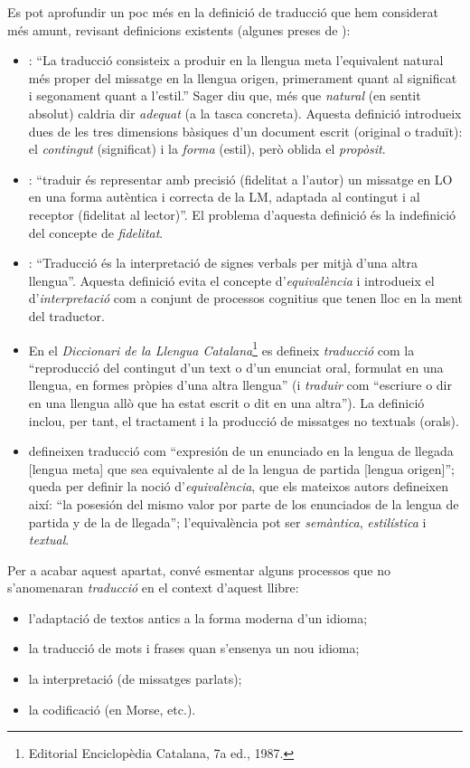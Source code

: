 Es pot aprofundir un poc més en la definició de traducció que hem
considerat més amunt, revisant definicions existents (algunes preses
de \citealt{sager93b}):
\begin{itemize}
\item \citet[p.~19]{nida59b}: ``La traducció consisteix a produir en
  la llengua meta l'equivalent natural més proper del missatge en la
  llengua origen, primerament quant al significat i segonament quant a
  l'estil.'' Sager diu que, més que \emph{natural} (en sentit absolut)
  caldria dir \emph{adequat} (a la tasca concreta). Aquesta definició
  introdueix dues de les tres dimensions bàsiques d'un document escrit
  (original o traduït): el \emph{contingut} (significat) i la
  \emph{forma} (estil), però oblida el \emph{propòsit}.
\item \citet{flamand83b}: ``traduir és representar amb precisió
  (fidelitat a l'autor) un missatge en LO en una forma autèntica i
  correcta de la LM, adaptada al contingut i al receptor (fidelitat al
  lector)''. El problema d'aquesta definició és la indefinició del
  concepte de \emph{fidelitat}.
\item \citet{jakobson66b}: ``Traducció és la interpretació de signes
  verbals per mitjà d'una altra llengua''. Aquesta definició evita el
  concepte d'\emph{equi\-va\-lèn\-cia} i introdueix el
  d'\emph{interpretació} com a conjunt de processos cognitius que
  tenen lloc en la ment del traductor.
\item En el \emph{Diccionari de la Llengua
    Catalana}\footnote{Editorial Enciclopèdia Catalana, 7a ed., 1987.}
  es defineix {\em traducció} com la ``reproducció del contingut d'un
  text o d'un enunciat oral, formulat en una llengua, en formes
  pròpies d'una altra llengua'' (i \emph{traduir} com ``escriure o dir
  en una llengua allò que ha estat escrit o dit en una altra''). La
  definició inclou, per tant, el tractament i la producció de
  missatges no textuals (orals).
\item \citet{alcaraz97b} defineixen traducció com ``expresión de un
  enunciado en la lengua de llegada [lengua meta] que sea equivalente
  al de la lengua de partida [lengua origen]''; queda per definir la
  noció d'\emph{equivalència}, que els mateixos autors defineixen
  així: ``la posesión del mismo valor por parte de los enunciados de
  la lengua de partida y de la de llegada''; l'equivalència pot ser
  {\em semàntica}, \emph{estilística} i \emph{textual}.
\end{itemize}

Per a acabar aquest apartat, convé esmentar alguns processos que no
s'anomenaran \emph{traducció} en el context d'aquest llibre:
\begin{itemize}
\item l'adaptació de textos antics a la forma moderna d'un idioma;
\item la traducció de mots i frases quan s'ensenya un nou idioma;
\item la interpretació (de missatges parlats);
\item la codificació (en Morse, etc.).
\end{itemize}

